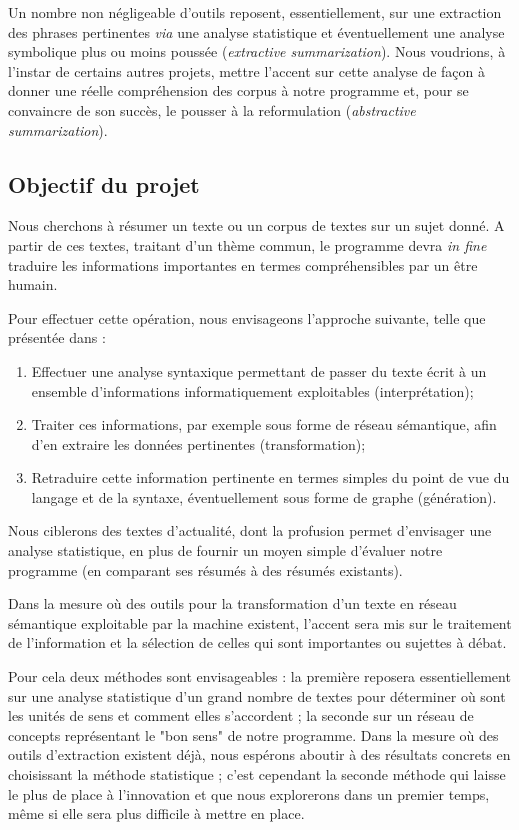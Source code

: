 \documentclass{article}           %
\begin{document}
Un nombre non négligeable d'outils reposent, essentiellement, sur une extraction des phrases pertinentes \textit{via} une analyse statistique et éventuellement une analyse symbolique plus ou moins poussée (\textit{extractive summarization}). Nous voudrions, à l'instar de certains autres projets, mettre l'accent sur cette analyse de façon à donner une réelle compréhension des corpus à notre programme et, pour se convaincre de son succès, le pousser à la reformulation (\textit{abstractive summarization}).

\subsection{Objectif du projet}
Nous cherchons à résumer un texte ou un corpus de textes sur un sujet donné. A partir de ces textes, traitant d'un thème commun, le programme devra \textit{in fine} traduire les informations importantes en termes compréhensibles par un être humain.


Pour effectuer cette opération, nous envisageons l'approche suivante, telle que présentée dans \cite{jones_automatic_2007} :

\begin{enumerate}
 \item Effectuer une analyse syntaxique permettant de passer du texte écrit à un ensemble d'informations informatiquement exploitables (interprétation);
 \item Traiter ces informations, par exemple sous forme de réseau sémantique, afin d'en extraire les données pertinentes (transformation);
 \item Retraduire cette information pertinente en termes simples du point de vue du langage et de la syntaxe, éventuellement sous forme de graphe (génération).
\end{enumerate}


Nous ciblerons des textes d'actualité, dont la profusion permet d'envisager une analyse statistique, en plus de fournir un moyen simple d'évaluer notre programme (en comparant ses résumés à des résumés existants).

Dans la mesure où des outils pour la transformation d'un texte en réseau sémantique exploitable par la machine existent, l'accent sera mis sur le traitement de l'information et la sélection de celles qui sont importantes ou sujettes à débat.

Pour cela deux méthodes sont envisageables : la première reposera essentiellement sur une analyse statistique d'un grand nombre de textes pour déterminer où sont les unités de sens et comment elles s'accordent ; la seconde sur un réseau de concepts représentant le "bon sens" de notre programme. Dans la mesure où des outils d'extraction existent déjà, nous espérons aboutir à des résultats concrets en choisissant la méthode statistique ; c'est cependant la seconde méthode qui laisse le plus de place à l'innovation et que nous explorerons dans un premier temps, m\^{e}me si elle sera plus difficile à mettre en place.
\end{document}
